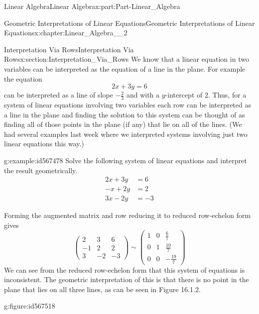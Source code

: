 \documentclass[oneside,10pt,]{book}
\numberwithin{equation}{section}
\newcommand{\amp}{&}
\begin{document}
\begin{partptx}{Linear Algebra}{}{Linear Algebra}{}{}{x:part:Part-Linear_Algebra}
\typeout{************************************************}
%
\begin{chapterptx}{Geometric Interpretations of Linear Equations}{}{Geometric Interpretations of Linear Equations}{}{}{x:chapter:Linear_Algebra__2}
%
%
\typeout{************************************************}
\typeout{************************************************}
%
\begin{sectionptx}{Interpretation Via Rows}{}{Interpretation Via Rows}{}{}{x:section:Interpretation_Via_Rows}
We know that a linear equation in two variables can be interpreted as the equation of a line in the plane. For example the equation%
\begin{equation*}
2x+3y=6
\end{equation*}
can be interpreted as a line of slope \(-\frac{2}{3}\) and with a \(y\)-intercept of \(2\). Thus, for a system of linear equations involving two variables each row can be interpreted as a line in the plane and finding the solution to this system can be thought of as finding all of those points in the plane (if any) that lie on all of the lines. (We had several examples last week where we interpreted systems involving just two linear equations this way.)%
\begin{example}{}{g:example:id567478}%
Solve the following system of linear equations and interpret the result geometrically.%
\begin{align*}
2x+3y \amp=6\\
-x+2y \amp=2\\
3x-2y \amp=-3
\end{align*}
%
\par\smallskip%
\noindent\hypertarget{g:solution:id567517}{}Forming the augmented matrix and row reducing it to reduced row-echelon form gives%
\begin{equation*}
\begin{pmatrix} 2 \amp 3 \amp 6 \\ -1 \amp 2 \amp 2 \\ 3 \amp -2 \amp -3 \end{pmatrix} \sim \begin{pmatrix} 1 \amp 0 \amp \frac{6}{7} \\ 0 \amp 1 \amp \frac{10}{7} \\ 0 \amp 0 \amp -\frac{19}{7} \end{pmatrix} 
\end{equation*}
We can see from the reduced row-echelon form that this system of equations is inconsistent. The geometric interpretation of this is that there is no point in the plane that lies on all three lines, as can be seen in Figure 16.1.2. \begin{figureptx}{}{g:figure:id567518}{}%

\end{figureptx}
\end{example}
\end{sectionptx}
\end{chapterptx}
\end{partptx}
\end{document}
